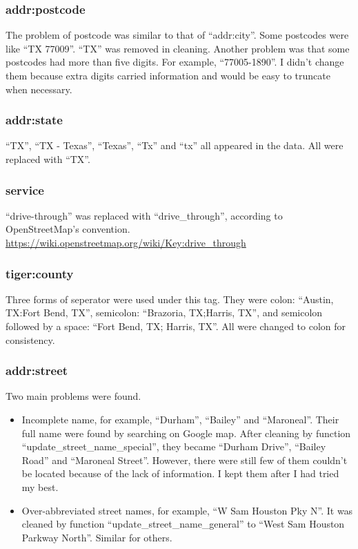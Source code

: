 \documentclass[12pt]{article}
\begin{document}
\subsubsection{addr:postcode}
The problem of postcode was similar to that of ``addr:city''. Some postcodes were like ``TX 77009''. ``TX'' was removed in cleaning. Another problem was that some postcodes had more than five digits. For example, ``77005-1890''. I didn't change them because extra digits carried information and would be easy to truncate when necessary.

\subsubsection{addr:state}
``TX'', ``TX - Texas'', ``Texas'', ``Tx'' and ``tx'' all appeared in the data. All were replaced with ``TX''.

\subsubsection{service}
``drive-through'' was replaced with ``drive\_through'', according to OpenStreetMap's convention.\\
 \url{https://wiki.openstreetmap.org/wiki/Key:drive_through}

\subsubsection{tiger:county}
Three forms of seperator were used under this tag. They were colon: ``Austin, TX:Fort Bend, TX'', semicolon: ``Brazoria, TX;Harris, TX'', and semicolon followed by a space: ``Fort Bend, TX; Harris, TX''. All were changed to colon for consistency.

\subsubsection{addr:street}
Two main problems were found.
\begin{itemize}
\item Incomplete name, for example, ``Durham'', ``Bailey'' and ``Maroneal''. Their full name were found by searching on Google map. After cleaning by function ``update\_street\_name\_special'', they became ``Durham Drive'', ``Bailey Road'' and ``Maroneal Street''. However, there were still few of them couldn't be located because of the lack of information. I kept them after I had tried my best.
\item Over-abbreviated street names, for example, ``W Sam Houston Pky N''. It was cleaned by function ``update\_street\_name\_general'' to ``West Sam Houston Parkway North''. Similar for others.
\end{itemize}
\end{document}
